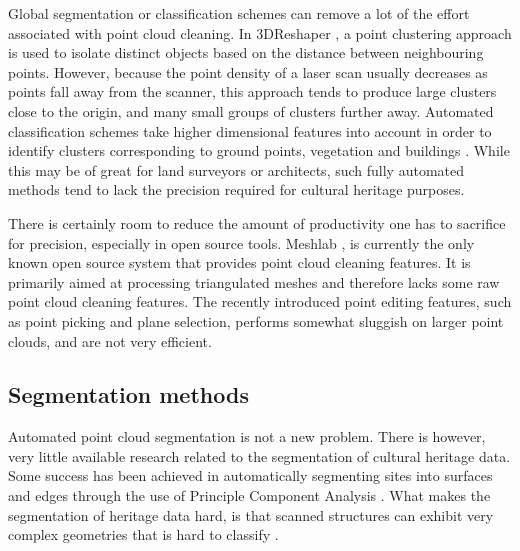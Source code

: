 \documentclass[10pt,twocolumn]{article}
\begin{document}
Global segmentation or classification schemes can remove a lot of the effort associated with point cloud cleaning. In 3DReshaper \cite{Technodigit2012}, a point clustering approach is used to isolate distinct objects based on the distance between neighbouring points. However, because the point density of a laser scan usually decreases as points fall away from the scanner, this approach tends to produce large clusters close to the origin, and many small groups of clusters further away. Automated classification schemes take higher dimensional features into account in order to identify clusters corresponding to ground points, vegetation and buildings \cite{Terrasolid2012,VirtualGrid2012,Carlson2012}. While this may be of great for land surveyors or architects, such fully automated methods tend to lack the precision required for cultural heritage purposes.

There is certainly room to reduce the amount of productivity one has to sacrifice for precision, especially in open source tools. Meshlab \cite{VisualComputingLaboratory2012}, is currently the only known open source system that provides point cloud cleaning features. It is primarily aimed at processing triangulated meshes and therefore lacks some raw point cloud cleaning features. The recently introduced point editing features, such as point picking and plane selection, performs somewhat sluggish on larger point clouds, and are not very efficient.





\subsection{Segmentation methods}

 Automated point cloud segmentation is not a new problem. There is however, very little available research related to the segmentation of cultural heritage data. Some success has been achieved in automatically segmenting sites into surfaces and edges through the use of Principle Component Analysis \cite{Spina2010}. What makes the segmentation of heritage data hard, is that scanned structures can exhibit very complex geometries that is hard to classify \cite{Spina2010}.
\end{document}
